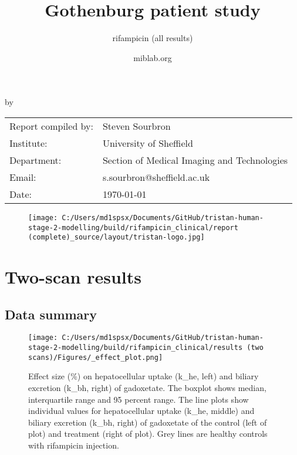 \documentclass{epflreport}%
\begin{document}
%
\normalsize%
\frontmatter%
\title{Gothenburg patient study}%
\subtitle{rifampicin (all results)}%
\author{miblab.org}%
\subject{D2.07 {-} Internal report}%
%
%
%
\makecover%
\begin{titlepage}%
\begin{center}%
\makeatletter%
\largetitlestyle\fontsize{45}{45}\selectfont\@title%
\makeatother%
\linebreak%
\makeatletter%
\ifdefvoid{\@subtitle}{}{\bigskip\titlestyle\fontsize{20}{20}\selectfont\@subtitle}%
\makeatother%
\linebreak%
\bigskip%
\bigskip%
by%
\linebreak%
\bigskip%
\bigskip%
\makeatletter%
\largetitlestyle\fontsize{25}{25}\selectfont\@author%
\makeatother%
\vfill%
\large%
\begin{tabular}{ll}%
\hline%
Report compiled by: &Steven Sourbron\\%
Institute: &University of Sheffield\\%
Department: &Section of Medical Imaging and Technologies\\%
Email: &s.sourbron@sheffield.ac.uk\\%
Date: &\today\\%
\hline%
\end{tabular}%


\begin{figure}[b!]%
\centering%
\centering%
\texttt{[image: C:/Users/md1spsx/Documents/GitHub/tristan-human-stage-2-modelling/build/rifampicin\_clinical/report (complete)\_source/layout/tristan-logo.jpg]}%
\end{figure}

%
\end{center}%
\end{titlepage}%
\newpage%
\tableofcontents%
\mainmatter%
\clearpage%
\chapter{Two{-}scan results}%
\section{Data summary}%
\label{sec:Datasummary}%

%


\begin{figure}[h!]%
\centering%
\texttt{[image: C:/Users/md1spsx/Documents/GitHub/tristan-human-stage-2-modelling/build/rifampicin\_clinical/results (two scans)/Figures/\_effect\_plot.png]}%
\caption{Effect size (\%) on hepatocellular uptake (k\_he, left) and biliary excretion (k\_bh, right) of gadoxetate. The boxplot shows median, interquartile range and 95 percent range. The line plots show individual values for hepatocellular uptake (k\_he, middle) and biliary excretion (k\_bh, right) of gadoxetate of the control (left of plot) and treatment (right of plot). Grey lines are healthy controls with rifampicin injection.}%
\end{figure}
\end{document}
